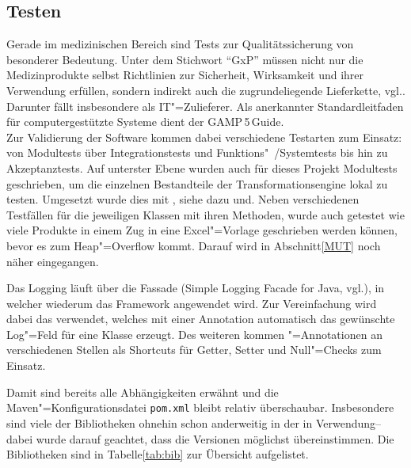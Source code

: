 \subsection{Testen} \label{Tests}
Gerade im medizinischen Bereich sind Tests zur Qualitätssicherung von besonderer Bedeutung. Unter dem Stichwort "`GxP"' müssen nicht nur die Medizinprodukte selbst Richtlinien zur Sicherheit, Wirksamkeit und ihrer Verwendung erfüllen, sondern indirekt auch die zugrundeliegende Lieferkette, vgl.\nbs\cite{gxp}. Darunter fällt insbesondere  als IT"=Zulieferer. Als anerkannter Standardleitfaden für computergestützte Systeme dient der GAMP\,5\,Guide\nbs\cite{gxp:gamp}.\\
Zur Validierung der Software kommen dabei verschiedene Testarten zum Einsatz: von Modultests über Integrationstests und Funktions"~/Systemtests bis hin zu Akzeptanztests. Auf unterster Ebene wurden auch für dieses Projekt Modultests geschrieben, um die einzelnen Bestandteile der Transformationsengine lokal zu testen. Umgesetzt wurde dies mit , siehe dazu\nbs\cite{test:junit} und\nbs\cite[S.\,47--79]{test:quali}. Neben verschiedenen Testfällen für die jeweiligen Klassen mit ihren Methoden, wurde auch getestet wie viele Produkte in einem Zug in eine Excel"=Vorlage geschrieben werden können, bevor es zum Heap"=Overflow kommt. Darauf wird in Abschnitt\nbs\ref{MUT} noch näher eingegangen.

Das Logging läuft über die Fassade  (Simple Logging Facade for Java, vgl.\nbs\cite{slf4j}), in welcher wiederum das Framework  angewendet wird.
Zur Vereinfachung wird dabei das \nbs\cite{lombok} verwendet, welches mit einer Annotation automatisch das gewünschte Log"=Feld für eine Klasse erzeugt. Des weiteren kommen "=Annotationen an verschiedenen Stellen als Shortcuts für Getter, Setter und Null"=Checks zum Einsatz.

Damit sind bereits alle Abhängigkeiten erwähnt und die Maven"=Konfigurationsdatei \texttt{pom.xml} bleibt relativ überschaubar. Insbesondere sind viele der Bibliotheken ohnehin schon anderweitig in der  in Verwendung\nbs --\nbs dabei wurde darauf geachtet, dass die Versionen möglichst übereinstimmen. Die Bibliotheken sind in Tabelle\nbs\ref{tab:bib} zur Übersicht aufgelistet.

